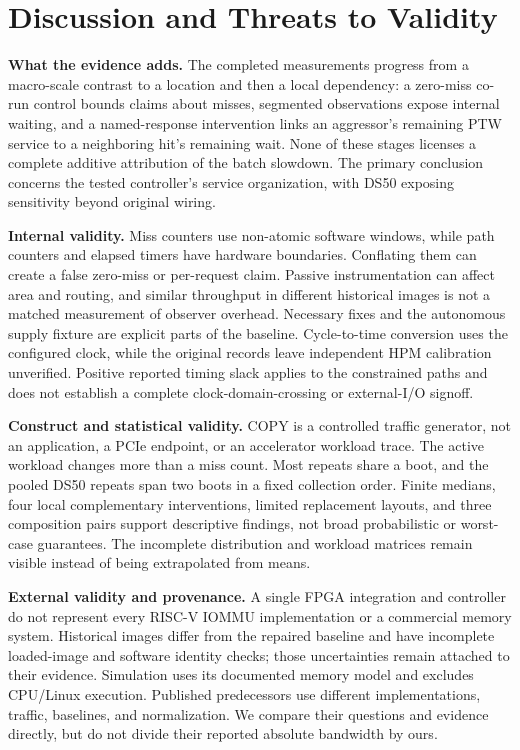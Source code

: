 \section{Discussion and Threats to Validity}
\textbf{What the evidence adds.} The completed measurements progress from a macro-scale contrast to a location and then a local dependency: a zero-miss co-run control bounds claims about misses, segmented observations expose internal waiting, and a named-response intervention links an aggressor's remaining PTW service to a neighboring hit's remaining wait. None of these stages licenses a complete additive attribution of the batch slowdown. The primary conclusion concerns the tested controller's service organization, with DS50 exposing sensitivity beyond original wiring.

\textbf{Internal validity.} Miss counters use non-atomic software windows, while path counters and elapsed timers have hardware boundaries. Conflating them can create a false zero-miss or per-request claim. Passive instrumentation can affect area and routing, and similar throughput in different historical images is not a matched measurement of observer overhead. Necessary fixes and the autonomous supply fixture are explicit parts of the baseline. Cycle-to-time conversion uses the configured clock, while the original records leave independent HPM calibration unverified. Positive reported timing slack applies to the constrained paths and does not establish a complete clock-domain-crossing or external-I/O signoff.

\textbf{Construct and statistical validity.} COPY is a controlled traffic generator, not an application, a PCIe endpoint, or an accelerator workload trace. The active workload changes more than a miss count. Most repeats share a boot, and the pooled DS50 repeats span two boots in a fixed collection order. Finite medians, four local complementary interventions, limited replacement layouts, and three composition pairs support descriptive findings, not broad probabilistic or worst-case guarantees. The incomplete distribution and workload matrices remain visible instead of being extrapolated from means.

\textbf{External validity and provenance.} A single FPGA integration and controller do not represent every RISC-V IOMMU implementation or a commercial memory system. Historical images differ from the repaired baseline and have incomplete loaded-image and software identity checks; those uncertainties remain attached to their evidence. Simulation uses its documented memory model and excludes CPU/Linux execution. Published predecessors use different implementations, traffic, baselines, and normalization. We compare their questions and evidence directly, but do not divide their reported absolute bandwidth by ours.
